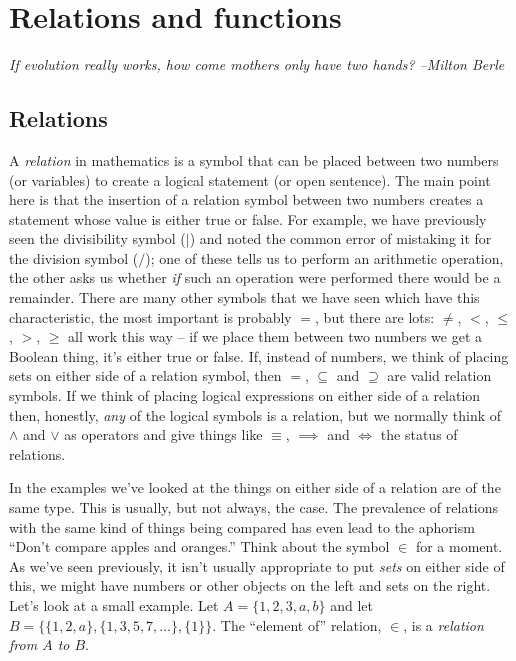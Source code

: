 
\chapter{Relations and functions}
\label{ch:rel}

{\em If evolution really works, how come mothers only have two hands? --Milton Berle}



\section{Relations}
\label{sec:rels}

A \emph{relation} in mathematics is a symbol that can be placed between
two numbers (or variables) to create a logical statement (or open sentence).
The main point here is that the insertion of a relation symbol between 
two numbers creates a statement whose value is either true or false.
For example, we have previously seen the divisibility symbol ($\mid$) and noted
the common error of mistaking it for the division symbol ($/$); one of these
tells us to perform an arithmetic operation, the other asks us whether 
\emph{if} such an operation were performed there would be a remainder.  
There are many other symbols that we have seen which have this characteristic,
the most important is probably $=$, but there are lots: $\neq$, $<$, $\leq$, 
$>$, $\geq$ all work this way -- if we place them between two numbers
we get a Boolean thing, it's either true or false.  If, instead of numbers, 
we think of placing sets on either side of a relation symbol, then
 $=$, $\subseteq$  and $\supseteq$ are valid relation symbols.  If we think 
of placing logical expressions on either side of a relation then, 
honestly, \emph{any} of the logical symbols is a relation, but we normally
think of $\land$ and $\lor$ as operators and give things like $\equiv$, 
$\implies$ and $\iff$ the status of relations. 

In the examples we've looked at the things on either side of a relation
are of the same type.  This is usually, but not always, the case.  The 
prevalence of relations with the same kind of things being compared has
even lead to the aphorism ``Don't compare apples and oranges.''  Think 
about the symbol $\in$ for a moment.  As we've seen previously, it
isn't usually appropriate to put \emph{sets} on either side of this,
we might have numbers or other objects on the left and sets on the right.
Let's look at a small example.  Let $A = \{1,2,3,a,b\}$ and let 
$B=\{ \{1,2,a\}, \{1,3,5,7,\ldots\}, \{1\} \}$.  The ``element of'' 
relation, $\in$, is a \emph{relation from $A$ to $B$}.  

